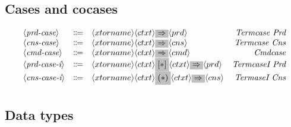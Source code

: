 \documentclass[11pt]{article}
\newcommand{\nonterminal}[1]{\langle #1 \rangle}
\newcommand{\terminal}[1]{\colorbox{lightgray}{#1}}
\begin{document}
\subsection{Cases and cocases}

\[
  \begin{array}{lclr}
    \nonterminal{\textit{prd-case}} & \Coloneqq & \nonterminal{xtorname} \nonterminal{ctxt} \terminal{$\Rightarrow$} \nonterminal{prd} & \emph{Termcase Prd} \\
    \nonterminal{\textit{cns-case}} & \Coloneqq & \nonterminal{xtorname} \nonterminal{ctxt} \terminal{$\Rightarrow$} \nonterminal{cns} & \emph{Termcase Cns} \\
    \nonterminal{\textit{cmd-case}} & \Coloneqq & \nonterminal{xtorname} \nonterminal{ctxt} \terminal{$\Rightarrow$} \nonterminal{cmd} & \emph{Cmdcase} \\
    \nonterminal{\textit{prd-case-i}} & \Coloneqq & \nonterminal{xtorname} \nonterminal{ctxt}\terminal{$[\ast]$}\nonterminal{ctxt} \terminal{$\Rightarrow$} \nonterminal{prd} & \emph{TermcaseI Prd} \\
    \nonterminal{\textit{cns-case-i}} & \Coloneqq & \nonterminal{xtorname} \nonterminal{ctxt}\terminal{$(\ast)$}\nonterminal{ctxt} \terminal{$\Rightarrow$} \nonterminal{cns} & \emph{TermaseI Cns} \\[0.2cm]
  \end{array}
\]


\subsection{Data types}
\end{document}
